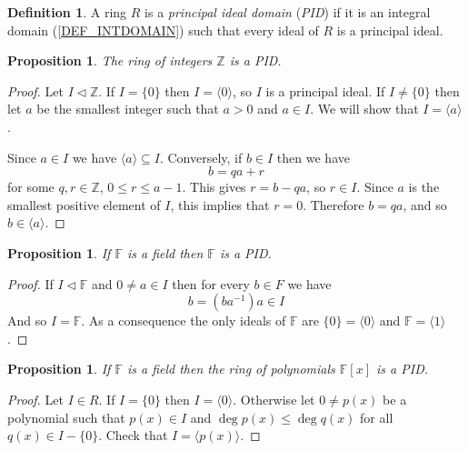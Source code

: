 \documentclass[12pt, letterpaper, oneside]{article}
\theoremstyle{plain}
\newtheorem{proposition}[theorem]{Proposition}
\theoremstyle{definition}
\newtheorem{definition}[theorem]{Definition}
\newcommand{\Z}{{\mathbb Z}}
\newcommand{\F}{{\mathbb F}}
\newcommand{\subgp}[1]{\langle#1\rangle}
\newcommand{\vs}{\vskip 5mm}
\begin{document}
\vs\vs


\begin{definition}
A ring $R$ is a \emph{principal ideal domain} (\emph{PID}) if it is an integral domain 
(\ref{DEF_INTDOMAIN}) such that every ideal of $R$ is a principal ideal.  
\end{definition}

\vs\vs

\begin{proposition}
The ring of integers $\Z$ is a PID.
\end{proposition}

\begin{proof}
Let $I\lhd \Z$. If $I = \{0\}$ then $I = \subgp{0}$, so $I$ is a principal ideal. If $I\neq \{0\}$
then let $a$ be the smallest integer such that $a>0$ and $a\in I$. We will show that $I = \subgp{a}$.

Since $a\in I$ we have $\subgp{a}\subseteq I$. Conversely, if $b\in I$ then we have 
$$b = qa +r$$
for some $q, r \in \Z$, $0\leq r \leq a-1$. This gives $r= b-qa$, so $r\in I$. Since $a$ is 
the smallest positive element of $I$, this implies that  $r=0$. Therefore $b = qa$, and
so  $b \in \subgp{a}$.   
\end{proof}

\vs\vs

\begin{proposition}
If $\F$ is a field then $\F$ is a PID. 
\end{proposition}

\vs

\begin{proof}
If $I\lhd \F$ and $0\neq a \in I$ then for every $b\in F$ we have 
$$b = (ba^{-1})a \in I$$
And so $I = \F$.
As a consequence the only ideals of $\F$ are $\{0\} = \subgp{0}$ and $\F = \subgp{1}$.
\end{proof}

\vs\vs

\begin{proposition}
If  $\F$ is a field then the ring of polynomials $\F[x]$ is a PID. 
\end{proposition}


\vs

\begin{proof}
Let $I\in R$. If $I= \{0\}$ then $I= \subgp{0}$. Otherwise let $0\neq p(x)$ be a polynomial 
such that $p(x)\in I$ and $\deg p(x) \leq \deg q(x)$ for all $q(x)\in I-\{0\}$. Check that
$I = \subgp{p(x)}$.
\end{proof}
\end{document}
